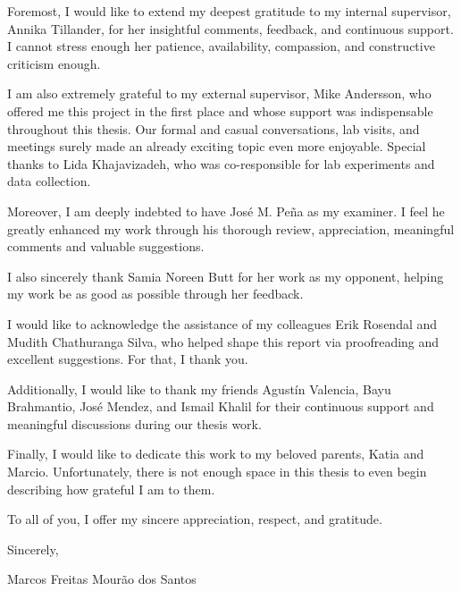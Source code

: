 
Foremost, I would like to extend my deepest gratitude to my internal supervisor, Annika Tillander, for her insightful comments, feedback, and continuous support. I cannot stress enough her patience, availability, compassion, and constructive criticism enough.

I am also extremely grateful to my external supervisor, Mike Andersson, who offered me this project in the first place and whose support was indispensable throughout this thesis. Our formal and casual conversations, lab visits, and meetings surely made an already exciting topic even more enjoyable. Special thanks to Lida Khajavizadeh, who was co-responsible for lab experiments and data collection.

Moreover, I am deeply indebted to have José M. Peña as my examiner. I feel he greatly enhanced my work through his thorough review, appreciation, meaningful comments and valuable suggestions.

I also sincerely thank Samia Noreen Butt for her work as my opponent, helping my work be as good as possible through her feedback.

I would like to acknowledge the assistance of my colleagues Erik Rosendal and Mudith Chathuranga Silva, who helped shape this report via proofreading and excellent suggestions. For that, I thank you.

Additionally, I would like to thank my friends Agustín Valencia, Bayu Brahmantio, José Mendez, and Ismail Khalil for their continuous support and meaningful discussions during our thesis work.

Finally, I would like to dedicate this work to my beloved parents, Katia and Marcio. Unfortunately, there is not enough space in this thesis to even begin describing how grateful I am to them.

To all of you, I offer my sincere appreciation, respect, and gratitude.

\null\hfill Sincerely,

\null\hfill Marcos Freitas Mourão dos Santos



